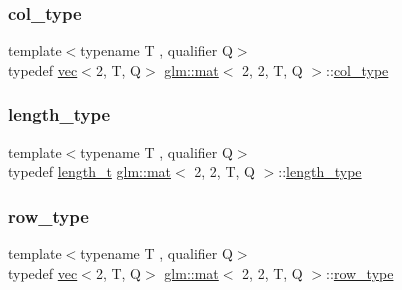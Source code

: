 \subsubsection{\texorpdfstring{col\+\_\+type}{col\_type}}
{\footnotesize\ttfamily template$<$typename T , qualifier Q$>$ \\
typedef \hyperlink{structglm_1_1vec}{vec}$<$2, T, Q$>$ \hyperlink{structglm_1_1mat}{glm\+::mat}$<$ 2, 2, T, Q $>$\+::\hyperlink{structglm_1_1mat_3_012_00_012_00_01_t_00_01_q_01_4_a2983591534ee443dd378cedcbe771749}{col\+\_\+type}}

\mbox{\label{structglm_1_1mat_3_012_00_012_00_01_t_00_01_q_01_4_a96c65b091fc8fe8e6f5637e30c9c1f81}} 
\subsubsection{\texorpdfstring{length\+\_\+type}{length\_type}}
{\footnotesize\ttfamily template$<$typename T , qualifier Q$>$ \\
typedef \hyperlink{namespaceglm_a090a0de2260835bee80e71a702492ed9}{length\+\_\+t} \hyperlink{structglm_1_1mat}{glm\+::mat}$<$ 2, 2, T, Q $>$\+::\hyperlink{structglm_1_1mat_3_012_00_012_00_01_t_00_01_q_01_4_a96c65b091fc8fe8e6f5637e30c9c1f81}{length\+\_\+type}}

\mbox{\label{structglm_1_1mat_3_012_00_012_00_01_t_00_01_q_01_4_a362ebaadd84b755d779b8f35dbaa5ba9}} 
\subsubsection{\texorpdfstring{row\+\_\+type}{row\_type}}
{\footnotesize\ttfamily template$<$typename T , qualifier Q$>$ \\
typedef \hyperlink{structglm_1_1vec}{vec}$<$2, T, Q$>$ \hyperlink{structglm_1_1mat}{glm\+::mat}$<$ 2, 2, T, Q $>$\+::\hyperlink{structglm_1_1mat_3_012_00_012_00_01_t_00_01_q_01_4_a362ebaadd84b755d779b8f35dbaa5ba9}{row\+\_\+type}}


